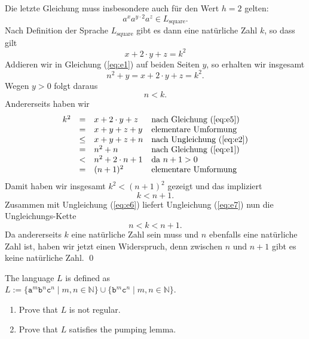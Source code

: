 Die letzte Gleichung muss insbesondere auch f\"ur den Wert $h=2$ gelten:
\[ a^xa^{y\cdot 2}a^z \in L_{\mathrm{square}}.  \]
Nach Definition der Sprache $L_{\mathrm{square}}$ gibt es dann eine nat\"urliche Zahl
$k$, so dass gilt
\begin{equation}
  \label{eq:e5}
  x + 2\cdot y + z = k^2
\end{equation}
Addieren wir in Gleichung (\ref{eq:e1}) auf beiden Seiten $y$, so erhalten wir insgesamt
\[ n^2 + y = x + 2\cdot y + z = k^2. \]
Wegen $y > 0$ folgt daraus 
\begin{equation}
  \label{eq:e6}
  n < k.    
\end{equation}
Andererseits haben wir
\[ 
\begin{array}[t]{lcll}
 k^2  & =    & x + 2 \cdot y + z       & \mbox{nach Gleichung (\ref{eq:e5}})   \\
      & =    & x + y + z + y           & \mbox{elementare Umformung}           \\
      & \leq & x + y + z + n           & \mbox{nach Ungleichung (\ref{eq:e2}}) \\
      & =    & n^2 + n                 & \mbox{nach Gleichung (\ref{eq:e1}})   \\
      & <    & n^2 + 2 \cdot n + 1     & \mbox{da $n+1 > 0$}                   \\ 
      & =    & (n + 1)^2               & \mbox{elementare Umformung}           \\ 
\end{array}
\]
Damit haben wir insgesamt  $k^2 < (n+1)^2$ gezeigt und das impliziert
\begin{equation}
  \label{eq:e7}
  k < n+1.
\end{equation}
Zusammen mit Ungleichung (\ref{eq:e6}) liefert Ungleichung (\ref{eq:e7}) nun die Ungleichungs-Kette
\[ n < k < n + 1. \]
Da andererseits $k$ eine nat\"urliche Zahl sein muss und $n$ ebenfalls eine nat\"urliche Zahl ist,
haben wir jetzt einen Widerspruch, denn zwischen $n$ und $n+1$ gibt es keine nat\"urliche Zahl.
\qed
\pagebreak

\renewcommand{\labelenumi}{(\alph{enumi})}

\exerciseEngStar
The language $L$ is defined as
\\[0.2cm]
\hspace*{1.3cm}
$L := \{ \mathtt{a}^m \mathtt{b}^n \mathtt{c}^n \mid m,n \in \mathbb{N} \} \cup 
      \{ \mathtt{b}^m \mathtt{c}^n \mid m,n \in \mathbb{N} \} 
$.
\begin{enumerate}
\item Prove that $L$ is not regular.
\item Prove that $L$ satisfies the pumping lemma.  \eox
\end{enumerate}

